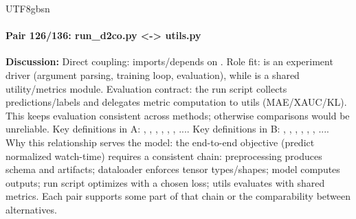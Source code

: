 \documentclass[11pt]{article}
\begin{document}
\begin{CJK*}{UTF8}{gbsn}
\paragraph{Pair 126/136: run\_d2co.py <-> utils.py}
\textbf{Discussion:} Direct coupling: \texttt{} imports/depends on \texttt{}. Role fit: \texttt{} is an experiment driver (argument parsing, training loop, evaluation), while \texttt{} is a shared utility/metrics module. Evaluation contract: the run script collects predictions/labels and delegates metric computation to utils (MAE/XAUC/KL). This keeps evaluation consistent across methods; otherwise comparisons would be unreliable. Key definitions in A: \texttt{}, \texttt{}, \texttt{}, \texttt{}, \texttt{}, \texttt{}, .... Key definitions in B: \texttt{}, \texttt{}, \texttt{}, \texttt{}, \texttt{}, \texttt{}, .... Why this relationship serves the model: the end-to-end objective (predict normalized watch-time) requires a consistent chain: preprocessing produces schema and artifacts; dataloader enforces tensor types/shapes; model computes outputs; run script optimizes with a chosen loss; utils evaluates with shared metrics. Each pair supports some part of that chain or the comparability between alternatives.


\end{CJK*}
\end{document}
